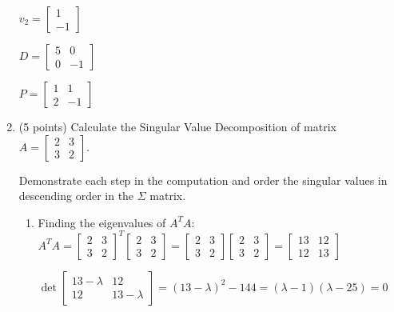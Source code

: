\documentclass{article}%
\begin{document}
\begin{enumerate}
    $v_2 = \begin{bmatrix}
        1\\
        -1 \end{bmatrix}$

    $D = \begin{bmatrix}
        5 & 0\\
        0 & -1 \end{bmatrix}$
    
    $P = \begin{bmatrix}
        1 & 1\\
        2 & -1 \end{bmatrix}$
    
    \item (5 points) Calculate the Singular Value Decomposition of matrix
    $A = \begin{bmatrix}
        2 & 3\\
        3 & 2
    \end{bmatrix}$.
    
    Demonstrate each step in the computation and order the singular values in descending order in the $\Sigma$ matrix.

    \begin{enumerate}
        \item Finding the eigenvalues of $A^TA$: \\
        $A^TA = \begin{bmatrix}
            2 & 3\\
            3 & 2
        \end{bmatrix}^T \begin{bmatrix}
            2 & 3\\
            3 & 2
        \end{bmatrix} = \begin{bmatrix}
            2 & 3\\
            3 & 2
        \end{bmatrix} \begin{bmatrix}
            2 & 3\\
            3 & 2
        \end{bmatrix} = \begin{bmatrix}
            13 & 12\\
            12 & 13
        \end{bmatrix}$

        $\det{\begin{bmatrix}
            13 - \lambda & 12\\
            12 & 13 - \lambda
        \end{bmatrix}} = (13 - \lambda)^2 - 144 = (\lambda - 1)(\lambda - 25) = 0$


\end{enumerate}
\end{enumerate}
\end{document}
